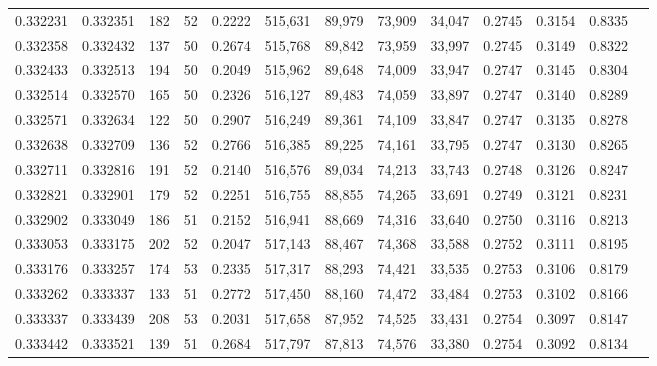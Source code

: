 \begin{tabular}{rrrrrrrrrrrrr}
0.332231 & 0.332351 &   182 &  52 &                                     0.2222 & 515,631 &  89,979 &  73,909 &  34,047 & 0.2745 & 0.3154 & 0.8335 \\
0.332358 & 0.332432 &   137 &  50 &                                     0.2674 & 515,768 &  89,842 &  73,959 &  33,997 & 0.2745 & 0.3149 & 0.8322 \\
0.332433 & 0.332513 &   194 &  50 &                                     0.2049 & 515,962 &  89,648 &  74,009 &  33,947 & 0.2747 & 0.3145 & 0.8304 \\
0.332514 & 0.332570 &   165 &  50 &                                     0.2326 & 516,127 &  89,483 &  74,059 &  33,897 & 0.2747 & 0.3140 & 0.8289 \\
0.332571 & 0.332634 &   122 &  50 &                                     0.2907 & 516,249 &  89,361 &  74,109 &  33,847 & 0.2747 & 0.3135 & 0.8278 \\
0.332638 & 0.332709 &   136 &  52 &                                     0.2766 & 516,385 &  89,225 &  74,161 &  33,795 & 0.2747 & 0.3130 & 0.8265 \\
0.332711 & 0.332816 &   191 &  52 &                                     0.2140 & 516,576 &  89,034 &  74,213 &  33,743 & 0.2748 & 0.3126 & 0.8247 \\
0.332821 & 0.332901 &   179 &  52 &                                     0.2251 & 516,755 &  88,855 &  74,265 &  33,691 & 0.2749 & 0.3121 & 0.8231 \\
0.332902 & 0.333049 &   186 &  51 &                                     0.2152 & 516,941 &  88,669 &  74,316 &  33,640 & 0.2750 & 0.3116 & 0.8213 \\
0.333053 & 0.333175 &   202 &  52 &                                     0.2047 & 517,143 &  88,467 &  74,368 &  33,588 & 0.2752 & 0.3111 & 0.8195 \\
0.333176 & 0.333257 &   174 &  53 &                                     0.2335 & 517,317 &  88,293 &  74,421 &  33,535 & 0.2753 & 0.3106 & 0.8179 \\
0.333262 & 0.333337 &   133 &  51 &                                     0.2772 & 517,450 &  88,160 &  74,472 &  33,484 & 0.2753 & 0.3102 & 0.8166 \\
0.333337 & 0.333439 &   208 &  53 &                                     0.2031 & 517,658 &  87,952 &  74,525 &  33,431 & 0.2754 & 0.3097 & 0.8147 \\
0.333442 & 0.333521 &   139 &  51 &                                     0.2684 & 517,797 &  87,813 &  74,576 &  33,380 & 0.2754 & 0.3092 & 0.8134 \\

\end{tabular}
